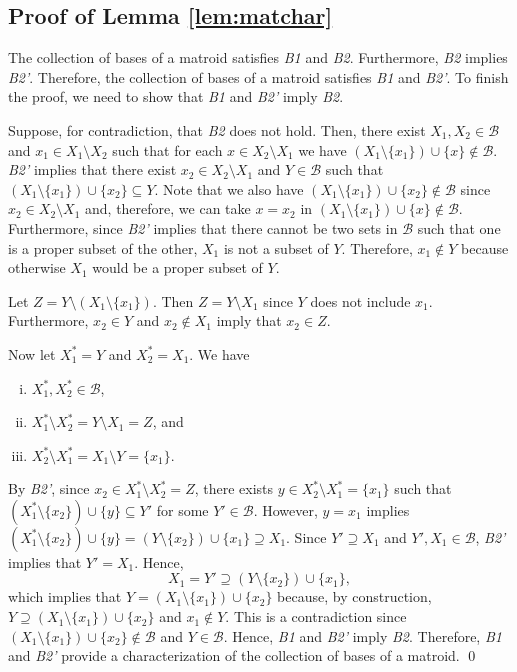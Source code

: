 \documentclass[12pt]{amsart}
\theoremstyle{remark}
\begin{document}
\subsection*{Proof of Lemma \ref{lem:matchar}}
The collection of bases of a matroid satisfies \emph{B1} and \emph{B2}. Furthermore,
\emph{B2} implies \emph{B2'}. Therefore, the collection of bases of a matroid
satisfies \emph{B1} and \emph{B2'}. To finish
the proof, we need to show that \emph{B1} and \emph{B2'} imply \emph{B2}.

Suppose, for contradiction, that \emph{B2} does not hold. Then, there exist
$X_1, X_2 \in \mathcal{B}$ and $x_1 \in X_1 \setminus X_2$ such that
for each $x\in X_2 \setminus X_1$ we have
$(X_1\setminus \{x_1\}) \cup \{x\} \not\in \mathcal{B}$.
\emph{B2'} implies that there exist $x_2 \in X_2 \setminus X_1$
and $Y \in \mathcal{B}$ such that
$(X_1\setminus \{x_1\}) \cup \{x_2\} \subseteq Y$. Note that we also have
$(X_1\setminus \{x_1\}) \cup \{x_2\} \not\in \mathcal{B}$ since
$x_2\in X_2 \setminus X_1$ and, therefore, we can take $x=x_2$ in
$(X_1\setminus \{x_1\}) \cup \{x\} \not\in \mathcal{B}$. Furthermore,
since \emph{B2'} implies that there cannot be two sets in $\mathcal{B}$ such
that one is a proper subset of the other, $X_1$ is not a
subset of $Y$. Therefore, $x_1\notin Y$ because otherwise $X_1$ would be
a proper subset of $Y$.

Let $Z=Y \setminus (X_1\setminus \{x_1\})$. Then $Z=Y \setminus X_1$ since $Y$ does
not include $x_1$. Furthermore, $x_2\in Y$ and $x_2\notin X_1$ imply that $x_2\in Z$.

Now let $X_1^{*} = Y$ and $X_2^{*} = X_1$. We have
\begin{enumerate}[(i)]
\item $X_1^{*}, X_2^{*} \in \mathcal B$,
\item $X_1^{*} \setminus X_2^{*} = Y \setminus X_1 = Z$, and
\item $X_2^{*} \setminus X_1^{*} = X_1 \setminus Y = \{x_1\}$.
\end{enumerate}
By \emph{B2'}, since $x_2\in X_1^{*} \setminus X_2^{*}=Z$, there exists
$y \in X_2^{*} \setminus X_1^{*}=\{x_1\}$ such that
$(X_1^{*} \setminus \{x_2\}) \cup \{y\} \subseteq Y'$ for
some $Y'\in \mathcal{B}$. However, $y=x_1$ implies
$(X_1^{*} \setminus \{x_2\}) \cup \{y\}
= (Y \setminus \{x_2\}) \cup \{x_1\} \supseteq X_1$. Since $Y'\supseteq X_1$ and $Y',X_1\in \mathcal{B}$, \emph{B2'} implies that $Y'=X_1$. Hence,
\[X_1=Y' \supseteq (Y \setminus \{x_2\}) \cup \{x_1\},\]
which implies that $Y=(X_1\setminus \{x_1\}) \cup \{x_2\}$ because, by
construction, $Y \supseteq (X_1\setminus \{x_1\}) \cup \{x_2\}$ and $x_1\notin Y$.
This is a contradiction since $(X_1\setminus \{x_1\}) \cup \{x_2\} \notin \mathcal{B}$ and $Y\in \mathcal{B}$. Hence, \emph{B1} and \emph{B2'} imply \emph{B2}.
Therefore, \emph{B1} and \emph{B2'} provide a characterization of the collection
of bases of a matroid.
\qed
\end{document}
